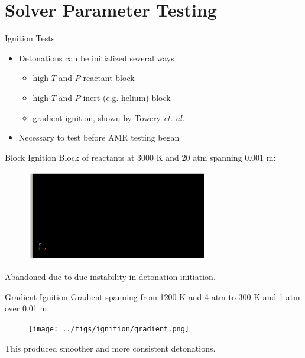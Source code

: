 \section{Solver Parameter Testing}

\begin{frame}{Ignition Tests}
\begin{itemize}
\item Detonations can be initialized several ways
\begin{itemize}
    \item high $T$ and $P$ reactant block
    \item high $T$ and $P$ inert (e.g. helium) block
    \item gradient ignition, shown by Towery \textit{et. al.} \cite{towery2}
\end{itemize}
\item Necessary to test before AMR testing began 
\end{itemize}    
\end{frame}

\begin{frame}{Block Ignition}
Block of reactants at 3000 K and 20 atm spanning 0.001 m:
\begin{figure}[]
\centering
\includegraphics[width=0.7\textwidth]{../figs/ignition/block.png}
\end{figure}%
Abandoned due to due instability in detonation initiation.
\end{frame}

\begin{frame}{Gradient Ignition}
Gradient spanning from 1200 K and 4 atm to 300 K and 1 atm over 0.01 m:
\begin{figure}[]
\centering
\texttt{[image: ../figs/ignition/gradient.png]}
\end{figure}%
This produced smoother and more consistent detonations. 
\end{frame}

